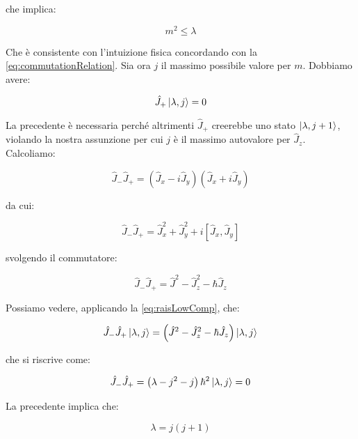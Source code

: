 che implica:

	\begin{equation}
		m^2 \le \lambda
	\end{equation}

Che \`e consistente con l'intuizione fisica concordando con la \eqref{eq:commutationRelation}. Sia ora $j$ il massimo possibile valore per $m$. Dobbiamo avere:

	\begin{equation}
		\hat{J}_+ \ket{\lambda, j} = 0
	\end{equation}

La precedente \`e necessaria perch\'e altrimenti $\hat{J}_+$ creerebbe uno stato $\ket{\lambda, j+1}$, violando la nostra assunzione per cui $j$ \`e il massimo autovalore per $\hat{J}_z$. Calcoliamo:

	\begin{equation}
		\hat{J}_- \hat{J}_+ = \left ( \hat{J}_x - i \hat{J}_y \right ) \left ( \hat{J}_x + i \hat{J}_y \right )
	\end{equation}

da cui:

	\begin{equation}
		\hat{J}_- \hat{J}_+ = \hat{J}^2_x + \hat{J}^2_y + i \left [ \hat{J}_x, \hat{J}_y \right ]
	\end{equation}

svolgendo il commutatore:

	\begin{equation} \label{eq:raisLowComp}
		\hat{J}_- \hat{J}_+	= \hat{J}^2 - \hat{J}_z^2 - \hbar \hat{J}_z
	\end{equation}

Possiamo vedere, applicando la \eqref{eq:raisLowComp}, che:

	\begin{equation}
		\hat{J}_- \hat{J}_+ \ket{\lambda, j} = \left ( \hat{J}^2 - \hat{J}_z^2 - \hbar \hat{J}_z \right ) \ket{\lambda, j}
	\end{equation}

che si riscrive come:

	\begin{equation}
		\hat{J}_- \hat{J}_+ = \left( \lambda - j^2 - j \right ) \hbar^2 \ket{\lambda, j} = 0
	\end{equation}

La precedente implica che:

	\begin{equation} \label{eq:lambdaVinc1}
		\lambda = j ( j + 1 )
	\end{equation}

